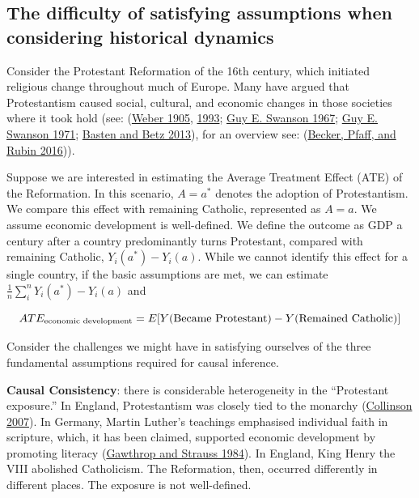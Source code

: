\documentclass[
  singlecolumn]{report}
\begin{document}
\hypertarget{the-difficulty-of-satisfying-assumptions-when-considering-historical-dynamics}{%
\subsection{The difficulty of satisfying assumptions when considering
historical
dynamics}\label{the-difficulty-of-satisfying-assumptions-when-considering-historical-dynamics}}

Consider the Protestant Reformation of the 16th century, which initiated
religious change throughout much of Europe. Many have argued that
Protestantism caused social, cultural, and economic changes in those
societies where it took hold (see:
(\protect\hyperlink{ref-weber1905}{Weber 1905},
\protect\hyperlink{ref-weber1993}{1993};
\protect\hyperlink{ref-swanson1967}{Guy E. Swanson 1967};
\protect\hyperlink{ref-swanson1971}{Guy E. Swanson 1971};
\protect\hyperlink{ref-basten2013}{Basten and Betz 2013}), for an
overview see: (\protect\hyperlink{ref-becker2016}{Becker, Pfaff, and
Rubin 2016})).

Suppose we are interested in estimating the Average Treatment Effect
(ATE) of the Reformation. In this scenario, \(A = a^*\) denotes the
adoption of Protestantism. We compare this effect with remaining
Catholic, represented as \(A = a\). We assume economic development is
well-defined. We define the outcome as GDP a century after a country
predominantly turns Protestant, compared with remaining Catholic,
\(Y_i(a^*) - Y_i(a)\). While we cannot identify this effect for a single
country, if the basic assumptions are met, we can estimate
\(\frac{1}{n} \sum_i^{n} Y_i(a^*) - Y_i(a)\) and

\[ATE_{\textnormal{economic~development}} = E[Y(\textnormal{Became~Protestant}) - Y(\textnormal{Remained~Catholic})]\]

Consider the challenges we might have in satisfying ourselves of the
three fundamental assumptions required for causal inference.

\textbf{Causal Consistency}: there is considerable heterogeneity in the
``Protestant exposure.'' In England, Protestantism was closely tied to
the monarchy (\protect\hyperlink{ref-collinson2007}{Collinson 2007}). In
Germany, Martin Luther's teachings emphasised individual faith in
scripture, which, it has been claimed, supported economic development by
promoting literacy (\protect\hyperlink{ref-gawthrop1984}{Gawthrop and
Strauss 1984}). In England, King Henry the VIII abolished Catholicism.
The Reformation, then, occurred differently in different places. The
exposure is not well-defined.
\end{document}
